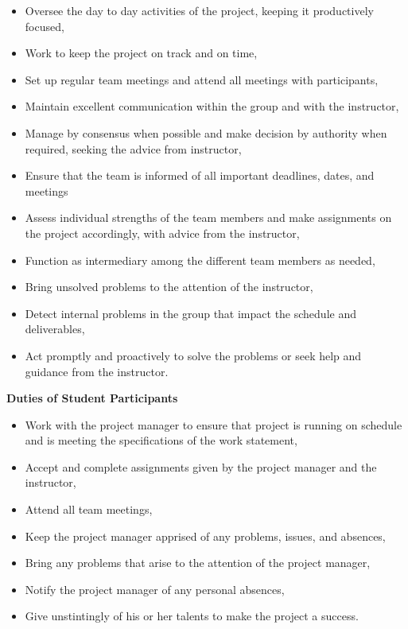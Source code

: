 \documentclass[12pt]{article}
\begin{document}
\begin{itemize}
    \item Oversee the day to day activities of the project, keeping it
        productively focused,
    \item Work to keep the project on track and on time,
    \item Set up regular team meetings and attend all meetings with participants,
    \item Maintain excellent communication within the group and with
      the instructor,
    \item Manage by consensus when possible and make decision by authority
        when required, seeking the advice from instructor,
    \item Ensure that the team is informed of all important deadlines, dates, and meetings
    \item Assess individual strengths of the team members and make assignments
        on the project accordingly, with advice from the instructor,
    \item Function as intermediary among the different team members as needed,
    \item Bring unsolved problems to the attention of the instructor,
    \item Detect internal problems in the group that impact the schedule and
        deliverables,
    \item Act promptly and proactively to solve the problems or seek
      help and guidance from the instructor.
\end{itemize}

\vskip0.25in

\begin{center}
    {\bf Duties of Student Participants}
\end{center}

\begin{itemize}
  \item Work with the project manager to ensure that project is running on
      schedule and is meeting the specifications of the work statement,
  \item Accept and complete assignments given by the project manager and the
      instructor,
  \item Attend all team meetings,
  \item Keep the project manager apprised of any problems, issues, and
      absences,
  \item Bring any problems that arise to the attention of the project manager,
  \item Notify the project manager of any personal absences,
  \item Give unstintingly of his or her talents to make the project a success.
\end{itemize}
\end{document}
